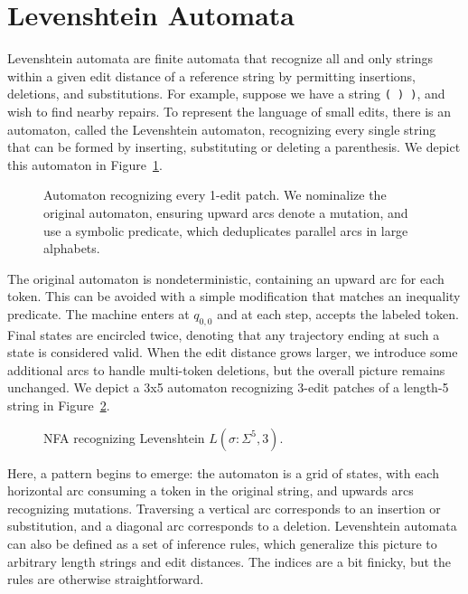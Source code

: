 \section{Levenshtein Automata}

Levenshtein automata are finite automata that recognize all and only strings within a given edit distance of a reference string by permitting insertions, deletions, and substitutions. For example, suppose we have a string \texttt{( ) )}, and wish to find nearby repairs. To represent the language of small edits, there is an automaton, called the Levenshtein automaton, recognizing every single string that can be formed by inserting, substituting or deleting a parenthesis. We depict this automaton in Figure~\ref{fig:lev_automaton}.

\begin{figure}[h!]
  
  \caption{Automaton recognizing every 1-edit patch. We nominalize the original automaton, ensuring upward arcs denote a mutation, and use a symbolic predicate, which deduplicates parallel arcs in large alphabets.}\label{fig:lev_automaton}\vspace{-5pt}
\end{figure}

The original automaton is nondeterministic, containing an upward arc for each token. This can be avoided with a simple modification that matches an inequality predicate. The machine enters at $q_{0, 0}$ and at each step, accepts the labeled token. Final states are encircled twice, denoting that any trajectory ending at such a state is considered valid.
When the edit distance grows larger, we introduce some additional arcs to handle multi-token deletions, but the overall picture remains unchanged. We depict a 3x5 automaton recognizing 3-edit patches of a length-5 string in Figure~\ref{fig:lev_nfa}.

\begin{figure}%
  \begin{center}
    
  \end{center}
  \caption{NFA recognizing Levenshtein $L(\sigma: \Sigma^5, 3)$.}\label{fig:lev_nfa}
\end{figure}

Here, a pattern begins to emerge: the automaton is a grid of states, with each horizontal arc consuming a token in the original string, and upwards arcs recognizing mutations. Traversing a vertical arc corresponds to an insertion or substitution, and a diagonal arc corresponds to a deletion. Levenshtein automata can also be defined as a set of inference rules, which generalize this picture to arbitrary length strings and edit distances. The indices are a bit finicky, but the rules are otherwise straightforward.

